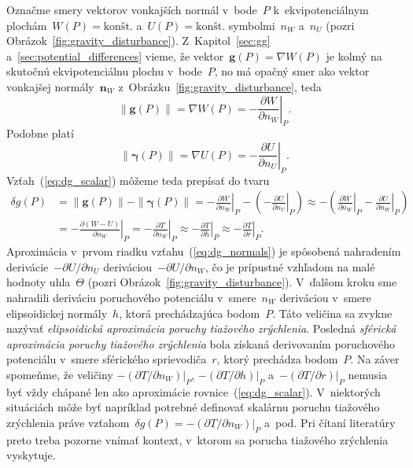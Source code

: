 \documentclass[a4paper,12pt]{book}
\let\vec\mathbf
\begin{document}
Označme smery vektorov vonkajších normál v~bode~$P$ k~ekvipotenciálnym 
plochám~$W(P) = \textrm{konšt.}$ a~$U(P) = \textrm{konšt.}$ symbolmi~$n_W$ 
a~$n_U$ (pozri Obrázok~\ref{fig:gravity_disturbance}).  Z~Kapitol~\ref{sec:gg} 
a~\ref{sec:potential_differences} vieme, že vektor~$\vec g(P) = \nabla W(P)$ je 
kolmý na skutočnú ekvipotenciálnu plochu v~bode~$P$, no má opačný smer ako 
vektor vonkajšej normály~$\vec n_W$ z~Obrázku~\ref{fig:gravity_disturbance}, 
teda
%
\begin{equation}
\| \vec g(P) \| = \nabla W(P) = -\left.\frac{\partial W}{\partial 
n_W}\right|_P.
\end{equation}
%
Podobne platí
%
\begin{equation}
\| \boldsymbol \gamma(P) \| = \nabla U(P) = -\left.\frac{\partial U}{\partial 
n_U}\right|_P.
\end{equation}
%
Vzťah~(\ref{eq:dg_scalar}) môžeme teda prepísať do tvaru
%
\begin{equation}
\label{eq:dg_normals}
\begin{split}
\delta g(P) &= \| \vec g(P) \| - \| \boldsymbol\gamma(P) \| 
= -\left.\frac{\partial W}{\partial n_W}\right|_P - \left( 
- \left.\frac{\partial U}{\partial n_U}\right|_P\right) \approx -\left( 
\left.\frac{\partial W}{\partial n_W}\right|_P - \left.\frac{\partial 
U}{\partial n_W}\right|_P\right)\\
%
&= -\left.\frac{\partial (W - U)}{\partial n_W}\right|_P 
=  -\left.\frac{\partial T}{\partial n_W}\right|_P \approx 
-\left.\frac{\partial T}{\partial h}\right|_P \approx -\left.\frac{\partial 
T}{\partial r}\right|_P{.}
\end{split}
\end{equation}
%
Aproximácia v~prvom riadku vzťahu~(\ref{eq:dg_normals}) je spôsobená nahradením 
derivácie~$-\partial U \slash \partial n_U$ deriváciou~$-\partial U \slash 
\partial n_W$, čo je prípustné vzhľadom na malé hodnoty uhla~$\Theta$ (pozri 
Obrázok~\ref{fig:gravity_disturbance}).  V~ďalšom kroku sme nahradili deriváciu 
poruchového potenciálu v~smere~$n_W$ deriváciou v~smere elipsoidickej 
normály~$h$, ktorá prechádzajúca bodom~$P$.  Táto veličina sa zvykne nazývať 
\emph{elipsoidická aproximácia poruchy tiažového zrýchlenia}.  Posledná 
\emph{sférická aproximácia poruchy tiažového zrýchlenia} bola získaná 
derivovaním poruchového potenciálu v~smere sférického sprievodiča~$r$, ktorý 
prechádza bodom~$P$.  Na záver spomeňme, že veličiny $-\left(\partial T \slash 
\partial n_W\right)|_P$, $-\left(\partial T \slash \partial h\right)|_P$ 
a~$-\left(\partial T \slash \partial r\right)|_P$ nemusia byť vždy chápané len 
ako aproximácie rovnice~(\ref{eq:dg_scalar}).  V~niektorých situáciách môže byť 
napríklad potrebné definovať skalárnu poruchu tiažového zrýchlenia práve 
vzťahom~$\delta g(P) = -\left(\partial T \slash \partial n_W\right)|_P$ a~pod.  
Pri čítaní literatúry preto treba pozorne vnímať kontext, v~ktorom sa porucha 
tiažového zrýchlenia vyskytuje.
\end{document}
